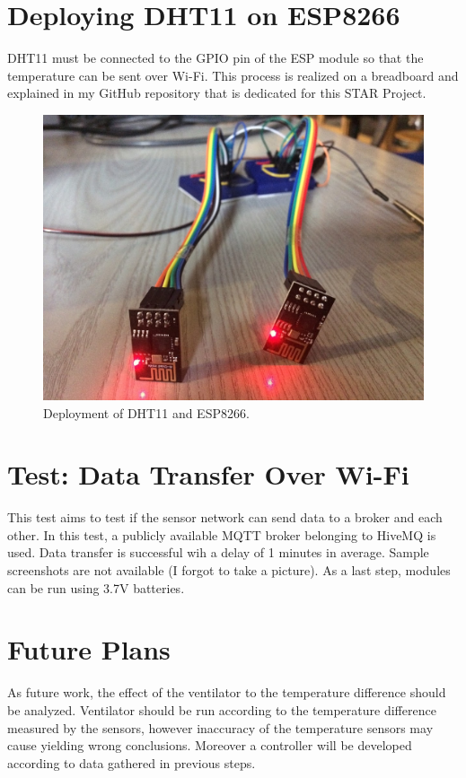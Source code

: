 \documentclass[a4paper,12pt]{article}
\begin{document}
\section{Deploying DHT11 on ESP8266}
DHT11 must be connected to the GPIO pin of the ESP module so that the temperature can be sent over Wi-Fi. This process is realized on a breadboard and explained in my GitHub repository \cite{ref-starGithub} that is dedicated for this STAR Project.
\begin{figure}[h]
	\center
	\setlength{\unitlength}{\textwidth} 
	\includegraphics[width=0.4\unitlength]{images/esp-modules}
	\caption{\label{fig:esp-modules}Deployment of DHT11 and ESP8266.}
\end{figure}
\section{Test: Data Transfer Over Wi-Fi}
This test aims to test if the sensor network can send data to a broker and each other. In this test, a publicly available MQTT broker belonging to HiveMQ is used. Data transfer is successful wih a delay of 1 minutes in average. Sample screenshots are not available (I forgot to take a picture). As a last step, modules can be run using 3.7V batteries.


\section{Future Plans}
As future work, the effect of the ventilator to the temperature difference should be analyzed. Ventilator should be run according to the temperature difference measured by the sensors, however inaccuracy of the temperature sensors may cause yielding wrong conclusions. Moreover a controller will be developed according to data gathered in previous steps.
\end{document}
